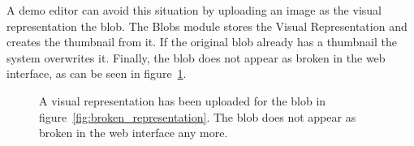 A demo editor can avoid this situation by uploading an image as the visual representation the blob. The Blobs module stores the Visual Representation and creates the thumbnail from it. If the original blob already has a thumbnail the system overwrites it. Finally, the blob does not appear as broken in the web interface, as can be seen in figure~\ref{fig:visual_representation}.
%
\begin{figure}[h]
\centering
{}
\caption{A visual representation has been uploaded for the blob in figure~\ref{fig:broken_representation}. The blob does not appear as broken in the web interface any more.} 
\label{fig:visual_representation}
\end{figure}
%


